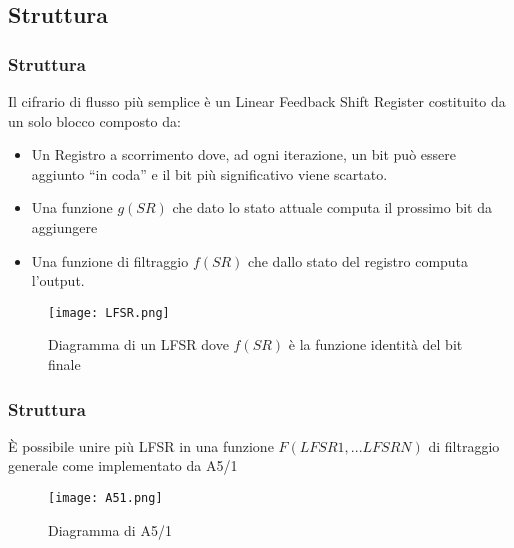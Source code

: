 \subsection{Struttura}
\begin{frame}
    \frametitle{Struttura}
    Il cifrario di flusso più semplice è un Linear Feedback Shift Register costituito da un solo blocco composto da:
    \begin{itemize}
        \item Un Registro a scorrimento dove, ad ogni iterazione, un bit può essere aggiunto ``in coda'' e il bit più significativo viene scartato.
        \item Una funzione $g(SR)$ che dato lo stato attuale computa il prossimo bit da aggiungere
        \item Una funzione di filtraggio $f(SR)$ che dallo stato del registro computa l'output.
    \end{itemize}

    \begin{figure}
        \centering
        \texttt{[image: LFSR.png]}
        \caption{Diagramma di un LFSR dove $f(SR)$ è la funzione identità del bit finale}
        \label{fig:lfsr}
    \end{figure}
\end{frame}

\begin{frame}
    \frametitle{Struttura}
    È possibile unire più LFSR in una funzione $F(LFSR1, ... LFSRN)$ di filtraggio generale come implementato da A5/1

    \begin{figure}
        \centering
        \texttt{[image: A51.png]}
        \caption{Diagramma di A5/1}
        \label{fig:a51}
    \end{figure}
\end{frame}
